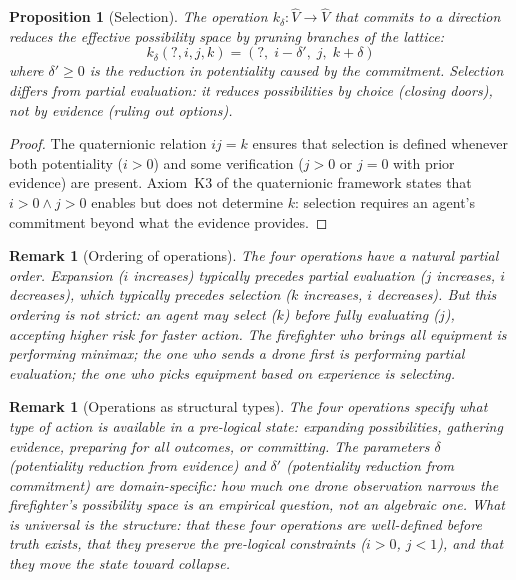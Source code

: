\documentclass[11pt,a4paper]{article}
\newtheorem{proposition}[theorem]{Proposition}
\newtheorem{remark}[theorem]{Remark}
\begin{document}
\begin{proposition}[Selection]
\label{prop:selection-op}
The operation $k_\delta: \hat{V} \to \hat{V}$ that commits to a
direction reduces the effective possibility space by pruning branches of
the lattice:
\begin{equation}
k_\delta(?, i, j, k) = (?, \; i - \delta', \; j, \; k + \delta)
\end{equation}
where $\delta' \geq 0$ is the reduction in potentiality caused by the
commitment. Selection differs from partial evaluation: it reduces
possibilities by \emph{choice} (closing doors), not by \emph{evidence}
(ruling out options).
\end{proposition}

\begin{proof}
The quaternionic relation $ij = k$ ensures that selection is defined
whenever both potentiality ($i > 0$) and some verification ($j > 0$ or
$j = 0$ with prior evidence) are present. Axiom~K3 of the quaternionic
framework \citep{p11} states that $i > 0 \wedge j > 0$ enables but does
not determine $k$: selection requires an agent's commitment beyond what
the evidence provides.
\end{proof}

\begin{remark}[Ordering of operations]
The four operations have a natural partial order. Expansion ($i$ increases)
typically precedes partial evaluation ($j$ increases, $i$ decreases), which
typically precedes selection ($k$ increases, $i$ decreases). But this
ordering is not strict: an agent may select ($k$) before fully evaluating
($j$), accepting higher risk for faster action. The firefighter who brings
all equipment is performing minimax; the one who sends a drone first is
performing partial evaluation; the one who picks equipment based on
experience is selecting.
\end{remark}

\begin{remark}[Operations as structural types]
\label{rem:operations-types}
The four operations specify what \emph{type} of action is available in a
pre-logical state: expanding possibilities, gathering evidence, preparing
for all outcomes, or committing. The parameters $\delta$ (potentiality
reduction from evidence) and $\delta'$ (potentiality reduction from
commitment) are domain-specific: how much one drone observation narrows
the firefighter's possibility space is an empirical question, not an
algebraic one. What is universal is the structure: that these four
operations are well-defined before truth exists, that they preserve the
pre-logical constraints ($i > 0$, $j < 1$), and that they move the
state toward collapse.
\end{remark}
\end{document}
